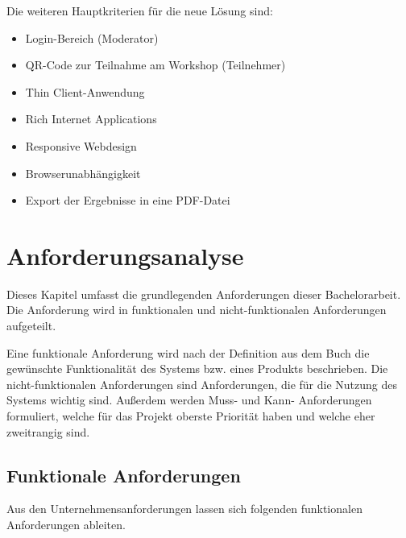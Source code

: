 Die weiteren Hauptkriterien für die neue Lösung sind:
\begin{itemize}
\item Login-Bereich (Moderator)
\item QR-Code zur Teilnahme am Workshop (Teilnehmer)
\item Thin Client-Anwendung
\item Rich Internet Applications
\item Responsive Webdesign 
\item Browserunabhängigkeit
\item Export der Ergebnisse in eine PDF-Datei
\end{itemize}

\section{Anforderungsanalyse}
\label{sec:anforderungsanalyse}
Dieses Kapitel umfasst die grundlegenden Anforderungen dieser Bachelorarbeit. Die Anforderung wird in funktionalen und nicht-funktionalen Anforderungen aufgeteilt.\bigskip

Eine funktionale Anforderung wird nach der Definition aus dem Buch \cite{Balzert2010} die gewünschte Funktionalität des Systems bzw. eines Produkts beschrieben. Die nicht-funktionalen Anforderungen sind Anforderungen, die für die Nutzung des Systems wichtig sind. Außerdem werden Muss- und Kann- Anforderungen formuliert, welche für das Projekt oberste Priorität haben und welche eher zweitrangig sind.

\subsection{Funktionale Anforderungen}
\label{sec:funktionale anforderungen}
Aus den Unternehmensanforderungen lassen sich folgenden funktionalen Anforderungen ableiten.

